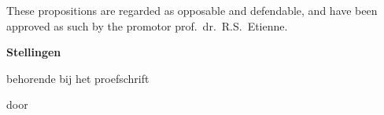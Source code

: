 \documentclass{propositions}
\begin{document}
\bigskip
\bigskip

\begin{center}
These propositions are regarded as opposable and defendable, and have been approved as such by the promotor prof.\ dr.\ R.S.\ Etienne.
\end{center}

\clearpage
{

\begin{center}

{\Large\titlefont\bfseries Stellingen}

\bigskip

behorende bij het proefschrift

\bigskip

{\makeatletter
\titlestyle\bfseries\large\@title
\makeatother}

{\makeatletter
\ifx\@subtitle\undefined\else
    \titlefont\titleshape\@subtitle
\fi
\makeatother}

\bigskip

door

\bigskip

\makeatletter
{\large\titlefont\bfseries\@firstname\ {\titleshape\@lastname}}
\makeatother

\end{center}

\bigskip
\bigskip

}
\end{document}
